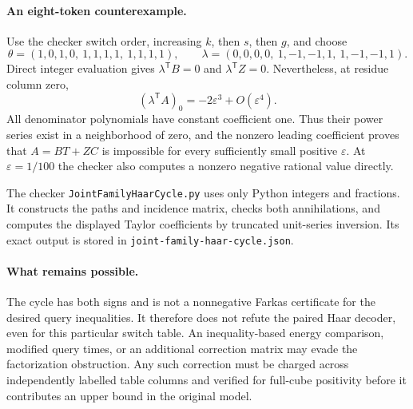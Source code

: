 \documentclass[11pt]{article}
\begin{document}
\paragraph{An eight-token counterexample.}
Use the checker switch order, increasing $k$, then $s$, then $g$, and
choose
\[
 \theta=(1,0,1,0,\ 1,1,1,1,\ 1,1,1,1),
 \qquad
 \lambda=(0,0,0,0,\ 1,-1,-1,1,\ 1,-1,-1,1).
\]
Direct integer evaluation gives
$\lambda^{\mathsf T}B=0$ and $\lambda^{\mathsf T}Z=0$.
Nevertheless, at residue column zero,
\[
 (\lambda^{\mathsf T}A)_0=-2\varepsilon^3+O(\varepsilon^4).
\]
All denominator polynomials have constant coefficient one. Thus their
power series exist in a neighborhood of zero, and the nonzero leading
coefficient proves that $A=BT+ZC$ is impossible for every sufficiently
small positive $\varepsilon$. At $\varepsilon=1/100$ the checker also
computes a nonzero negative rational value directly.

The checker \texttt{JointFamilyHaarCycle.py} uses only Python integers
and fractions. It constructs the paths and incidence matrix, checks both
annihilations, and computes the displayed Taylor coefficients by truncated
unit-series inversion. Its exact output is stored in
\texttt{joint-family-haar-cycle.json}.

\paragraph{What remains possible.}
The cycle has both signs and is not a nonnegative Farkas certificate for
the desired query inequalities. It therefore does not refute the paired
Haar decoder, even for this particular switch table. An inequality-based
energy comparison, modified query times, or an additional correction
matrix may evade the factorization obstruction. Any such correction must
be charged across independently labelled table columns and verified for
full-cube positivity before it contributes an upper bound in the original
model.
\end{document}
